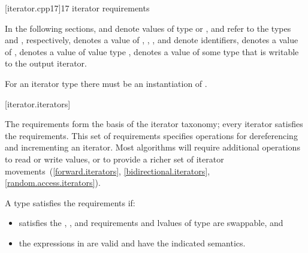 [iterator.cpp17]{\Cpp{}17 iterator requirements}

\pnum
In the following sections,
and
denote values of type
 or ,
 and  refer to the
types  and
, respectively,
denotes a value of
,
,
,
and
denote identifiers,
denotes a value of
,
denotes a value of value type
,
denotes a value of some type that is writable to the output iterator.
\begin{note} For an iterator type  there must be an instantiation
of . \end{note}

[iterator.iterators]{}

\pnum
The  requirements form the basis of the iterator
taxonomy; every iterator satisfies the  requirements. This
set of requirements specifies operations for dereferencing and incrementing
an iterator. Most algorithms will require additional operations to
read or write values, or
to provide a richer set of iterator movements~(\ref{forward.iterators},
\ref{bidirectional.iterators}, \ref{random.access.iterators}).

\pnum
A type  satisfies the  requirements if:

\begin{itemize}
\item {} satisfies the , , and
 requirements and lvalues
of type  are swappable, and

\item the expressions in  are valid and have
the indicated semantics.
\end{itemize}

